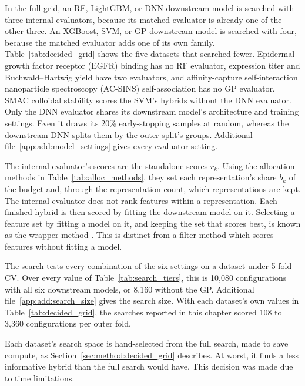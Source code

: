 In the full grid, an RF, LightGBM, or DNN downstream model is searched with three internal evaluators, because its matched evaluator is already one of the other three. An XGBoost, SVM, or GP downstream model is searched with four, because the matched evaluator adds one of its own family. Table~\ref{tab:decided_grid} shows the five datasets that searched fewer. Epidermal growth factor receptor (EGFR) binding has no RF evaluator, expression titer and Buchwald--Hartwig yield have two evaluators, and affinity-capture self-interaction nanoparticle spectroscopy (AC-SINS) self-association has no GP evaluator. SMAC colloidal stability scores the SVM's hybrids without the DNN evaluator. Only the DNN evaluator shares its downstream model's architecture and training settings. Even it draws its 20\% early-stopping samples at random, whereas the downstream DNN splits them by the outer split's groups. Additional file~\ref{app:add:model_settings} gives every evaluator setting.

The internal evaluator's scores are the standalone scores $r_k$. Using the allocation methods in Table~\ref{tab:alloc_methods}, they set each representation's share $b_k$ of the budget and, through the representation count, which representations are kept. The internal evaluator does not rank features within a representation. Each finished hybrid is then scored by fitting the downstream model on it. Selecting a feature set by fitting a model on it, and keeping the set that scores best, is known as the wrapper method \citep{Kohavi1997}. This is distinct from a filter method which scores features without fitting a model. 

The search tests every combination of the six settings on a dataset under 5-fold CV. Over every value of Table~\ref{tab:search_tiers}, this is 10,080 configurations with all six downstream models, or 8,160 without the GP. Additional file~\ref{app:add:search_size} gives the search size. With each dataset's own values in Table~\ref{tab:decided_grid}, the searches reported in this chapter scored 108 to 3,360 configurations per outer fold.

Each dataset's search space is hand-selected from the full search, made to save compute, as Section~\ref{sec:method:decided_grid} describes. At worst, it finds a less informative hybrid than the full search would have. This decision was made due to time limitations.

